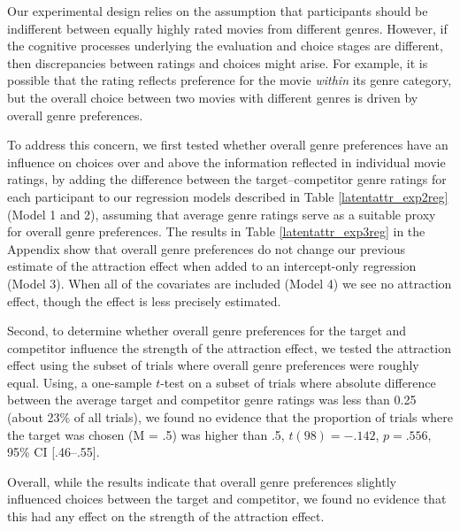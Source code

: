 \documentclass[12pt, a4paper]{article}
\begin{document}
Our experimental design relies on the assumption that participants should be indifferent between equally highly rated movies from different genres. However, if the cognitive processes underlying the evaluation and choice stages are different, then discrepancies between ratings and choices might arise. For example, it is possible that the rating reflects preference for the movie \textit{within} its genre category, but the overall choice between two movies with different genres is driven by overall genre preferences.

To address this concern, we first tested whether overall genre preferences have an influence on choices over and above the information reflected in individual movie ratings, by adding the difference between the target–competitor genre ratings for each participant to our regression models described in Table \ref{latentattr_exp2reg} (Model 1 and 2), assuming that average genre ratings serve as a suitable proxy for overall genre preferences. The results in Table \ref{latentattr_exp3reg} in the Appendix show that overall genre preferences do not change our previous estimate of the attraction effect when added to an intercept-only regression (Model 3). When all of the covariates are included (Model 4) we see no attraction effect, though the effect is less precisely estimated.

Second, to determine whether overall genre preferences for the target and competitor influence the strength of the attraction effect, we tested the attraction effect using the subset of trials where overall genre preferences were roughly equal. Using, a one-sample $t$-test on a subset of trials where absolute difference between the average target and competitor genre ratings was less than 0.25 (about 23\% of all trials), we found no evidence that the proportion of trials where the target was chosen (M = .5) was higher than .5, $t(98)=-.142$, $p=.556$, 95\% CI [.46--.55].
  
Overall, while the results indicate that overall genre preferences slightly influenced choices between the target and competitor, we found no evidence that this had any effect on the strength of the attraction effect.
\end{document}
